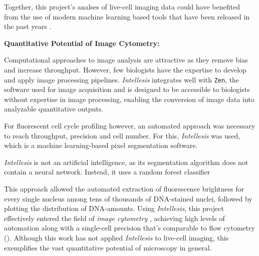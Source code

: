 Together, this project's analses of live-cell imaging data could have benefited
from the use of modern machine learning based tools that have been released in
the past years \cite{pylvanainenLivecellImagingDeep2023}. 




\textbf{Quantitative Potential of Image Cytometry:}

Computational approaches to image analysis are attractive as they remove bias
and increase throughput. However, few biologists have the expertise to develop
and apply image processing pipelines. \textit{Intellesis} integrates well with 
\texttt{Zen}, the software used for image acquisition and is designed to be
accessible to biologists without expertise in image processing, enabling the
conversion of image data into analyzable quantitative outputs.



For
fluorescent cell cycle profiling however, an automated approach was necessary to
reach throughput, precision and cell number. For this, \textit{Intellesis} was
used, which is a machine learning-based pixel segmentation software.

\textit{Intellesis} is not an artificial intelligence, as its segmentation algorithm
does not contain a neural network. Instead, it uses a random forest classifier



This approach allowed the automated
extraction of fluorescence brightness for every single nucleus among tens of
thousands of DNA-stained nuclei, followed by plotting the distribution of
DNA-amounts. Using \textit{Intellesis}, this project effectively entered the
field of \emph{image cytometry} \cite{guptaDeepLearningImage2019}, achieving
high levels of automation along with a single-cell precision that's comparable
to flow cytometry (). Although this work has not
applied \textit{Intellesis} to live-cell imaging, this exemplifies the vast
quantitative potential of microscopy 
in general.



